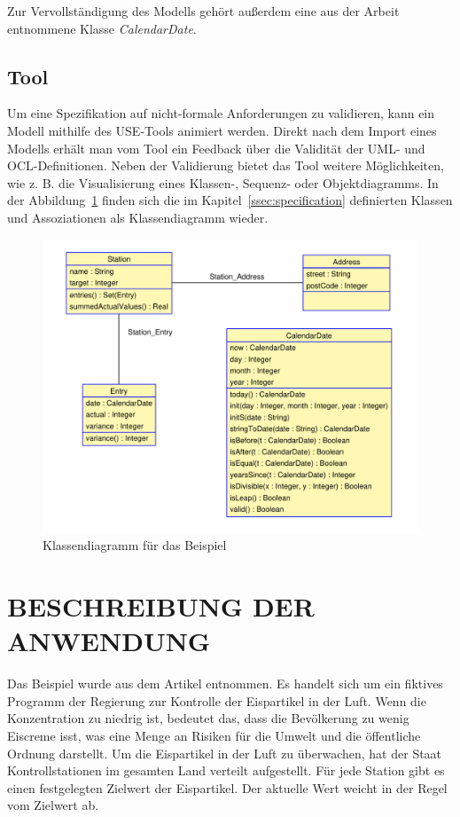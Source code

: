 \documentclass[a4paper,twoside]{article}
\begin{document}
Zur Vervollständigung des Modells gehört außerdem eine aus der Arbeit \cite{SilvaMasterThesis} entnommene Klasse \textit{CalendarDate}.

\subsection{Tool}

Um eine Spezifikation auf nicht-formale Anforderungen zu validieren, kann ein Modell mithilfe des USE-Tools animiert werden. Direkt nach dem Import eines Modells erhält man vom Tool ein Feedback über die Validität der UML- und OCL-Definitionen. Neben der Validierung bietet das Tool weitere Möglichkeiten, wie z. B. die Visualisierung eines Klassen-, Sequenz- oder Objektdiagramms. In der Abbildung~\ref{fig:Grafik2} finden sich die im Kapitel~\ref{ssec:specification} definierten Klassen und Assoziationen als Klassendiagramm wieder.

\begin{figure}[!h]
	\includegraphics[scale=.4]{pics/USE_class_diagramm.pdf}
	\caption{Klassendiagramm für das Beispiel}
	\label{fig:Grafik2}
\end{figure}

\section{\uppercase{Beschreibung der Anwendung}}

Das Beispiel wurde aus dem Artikel \cite{Gui06} entnommen. Es handelt sich um ein fiktives Programm der Regierung zur Kontrolle der Eispartikel in der Luft. Wenn die Konzentration zu niedrig ist, bedeutet das, dass die Bevölkerung zu wenig Eiscreme isst, was eine Menge an Risiken für die Umwelt und die öffentliche Ordnung darstellt. Um die Eispartikel in der Luft zu überwachen, hat der Staat Kontrollstationen im gesamten Land verteilt aufgestellt. Für jede Station gibt es einen festgelegten Zielwert der Eispartikel. Der aktuelle Wert weicht in der Regel vom Zielwert ab. 
\\
\end{document}

